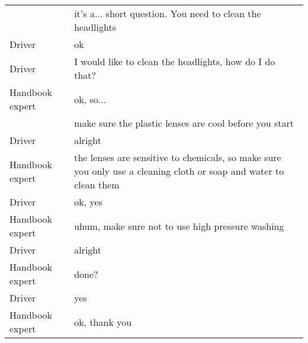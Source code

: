 \begin{table}[H]
\begin{tabular}{p{3cm}p{8cm}}
                & it's a... short question. You need to clean the headlights                                                              \\
Driver          & ok                                                                                                                      \\
Driver          & I would like to clean the headlights, how do I do that?                                                                 \\
Handbook expert & ok, so...                                                                                                               \\
                & make sure the plastic lenses are cool before you start                                                                  \\
Driver          & alright                                                                                                                 \\
Handbook expert & the lenses are sensitive to chemicals, so make sure you only use a cleaning cloth or soap and water to clean them       \\
Driver          & ok, yes                                                                                                                 \\
Handbook expert & uhum, make sure not to use high pressure washing                                                                        \\
Driver          & alright                                                                                                                 \\
Handbook expert & done?                                                                                                                   \\
Driver          & yes                                                                                                                     \\
Handbook expert & ok, thank you                                                         \end{tabular}
\end{table}                                         